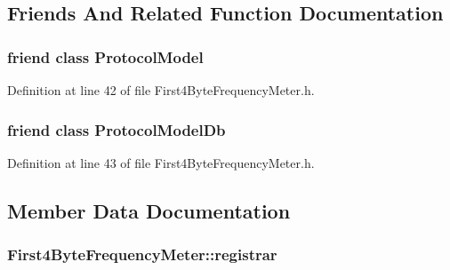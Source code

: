 \subsection{Friends And Related Function Documentation}
\hypertarget{class_vsid_1_1_first4_byte_frequency_meter_a80219b863d4ff3456933d16bc5f73f45}{
\subsubsection[{Protocol\-Model}]{\setlength{\rightskip}{0pt plus 5cm}friend class {\bf Protocol\-Model}\hspace{0.3cm}{\ttfamily [friend]}}}\label{class_vsid_1_1_first4_byte_frequency_meter_a80219b863d4ff3456933d16bc5f73f45}


Definition at line 42 of file First4\-Byte\-Frequency\-Meter.\-h.

\hypertarget{class_vsid_1_1_first4_byte_frequency_meter_a3c0d389e7a9476b06313d8fb9ca9fe68}{
\subsubsection[{Protocol\-Model\-Db}]{\setlength{\rightskip}{0pt plus 5cm}friend class {\bf Protocol\-Model\-Db}\hspace{0.3cm}{\ttfamily [friend]}}}\label{class_vsid_1_1_first4_byte_frequency_meter_a3c0d389e7a9476b06313d8fb9ca9fe68}


Definition at line 43 of file First4\-Byte\-Frequency\-Meter.\-h.



\subsection{Member Data Documentation}
\hypertarget{class_vsid_1_1_first4_byte_frequency_meter_a7512bb139e9d0542d3c840a5c4f6052f}{
\subsubsection[{registrar}]{ First4\-Byte\-Frequency\-Meter\-::registrar\hspace{0.3cm}{\ttfamily [static]}}}\label{class_vsid_1_1_first4_byte_frequency_meter_a7512bb139e9d0542d3c840a5c4f6052f}


